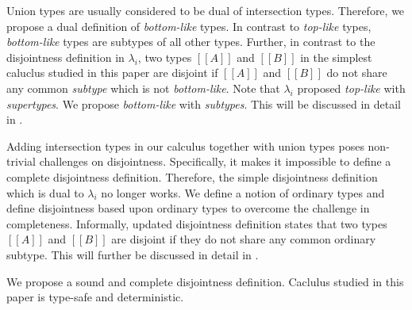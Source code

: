 Union types are usually considered to be dual of intersection types.
Therefore, we propose a dual definition of \emph{bottom-like} types.
In contrast to \emph{top-like} types, \emph{bottom-like} types are
subtypes of all other types. Further, in contrast to the disjointness
definition in $\lambda_{i}$, two types $[[A]]$ and $[[B]]$ in the simplest 
caluclus studied in this paper are disjoint if $[[A]]$ and $[[B]]$
do not share any common \emph{subtype} which is not \emph{bottom-like}.
Note that $\lambda_{i}$ proposed \emph{top-like} with \emph{supertypes}.
We propose \emph{bottom-like} with \emph{subtypes}. This will be discussed
in detail in .

Adding intersection types in our calculus
together with union types poses non-trivial challenges on disjointness.
Specifically, it makes it impossible to define a complete disjointness
definition. Therefore, the simple disjointness definition which is dual
to $\lambda_{i}$ no longer works. We define a notion of ordinary types
and define disjointness based upon ordinary types to overcome the
challenge in completeness. Informally, updated disjointness definition states
that two types $[[A]]$ and $[[B]]$ are disjoint if they do not share any
common ordinary subtype. This will further be discussed in detail in
.

We propose a sound and complete disjointness definition. Caclulus studied
in this paper is type-safe and deterministic.

